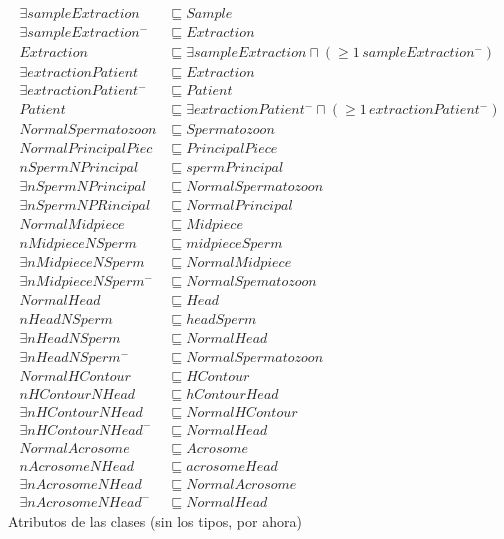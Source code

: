\documentclass{article}
\begin{document}
\begin{align*}
\exists sampleExtraction &\sqsubseteq Sample \\
\exists sampleExtraction ^- &\sqsubseteq Extraction \\
Extraction &\sqsubseteq \exists sampleExtraction \sqcap(\geq 1\, sampleExtraction^-)\\
\exists extractionPatient &\sqsubseteq Extraction \\
\exists extractionPatient^- &\sqsubseteq Patient \\
Patient &\sqsubseteq \exists extractionPatient ^- \sqcap(\geq 1\, extractionPatient^-)\\
NormalSpermatozoon &\sqsubseteq Spermatozoon\\
NormalPrincipalPiec &\sqsubseteq PrincipalPiece\\
nSpermNPrincipal &\sqsubseteq spermPrincipal\\
\exists nSpermNPrincipal &\sqsubseteq NormalSpermatozoon\\
\exists nSpermNPRincipal &\sqsubseteq NormalPrincipal\\
NormalMidpiece &\sqsubseteq Midpiece\\
nMidpieceNSperm &\sqsubseteq midpieceSperm\\
\exists nMidpieceNSperm &\sqsubseteq NormalMidpiece\\
\exists nMidpieceNSperm^- &\sqsubseteq NormalSpematozoon\\
NormalHead &\sqsubseteq Head\\
nHeadNSperm &\sqsubseteq headSperm\\
\exists nHeadNSperm &\sqsubseteq NormalHead\\
\exists nHeadNSperm^-& \sqsubseteq NormalSpermatozoon\\
NormalHContour &\sqsubseteq HContour\\
nHContourNHead &\sqsubseteq hContourHead\\
\exists nHContourNHead &\sqsubseteq NormalHContour\\
\exists nHContourNHead^-&\sqsubseteq NormalHead\\
NormalAcrosome &\sqsubseteq Acrosome\\
nAcrosomeNHead &\sqsubseteq acrosomeHead\\
\exists nAcrosomeNHead &\sqsubseteq NormalAcrosome\\
\exists nAcrosomeNHead^-&\sqsubseteq NormalHead
\end{align*}
Atributos de las clases (sin los tipos, por ahora)
\end{document}
